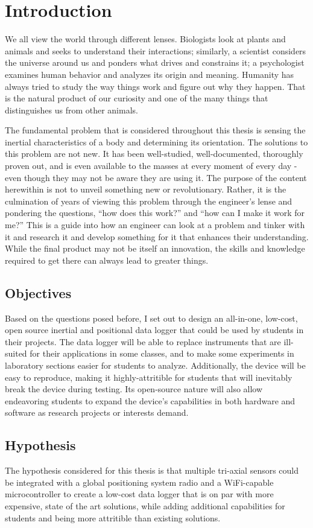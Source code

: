 \chapter{Introduction} 
We all view the world through different lenses.
Biologists look at plants and animals and seeks to understand their interactions;
similarly, a scientist considers the universe around us and ponders what drives and constrains it;
a psychologist examines human behavior and analyzes its origin and meaning.
Humanity has always tried to study the way things work and figure out why they happen.
That is the natural product of our curiosity and one of the many things that distinguishes us from other animals.

The fundamental problem that is considered throughout this thesis is sensing the inertial characteristics of a body and determining its orientation.
The solutions to this problem are not new.
It has been well-studied, well-documented, thoroughly proven out, and is even available to the masses at every moment of every day - even though they may not be aware they are using it.
The purpose of the content herewithin is not to unveil something new or revolutionary.
Rather, it is the culmination of years of viewing this problem through the engineer's lense and pondering the questions, ``how does this work?'' and ``how can I make it work for me?''
This is a guide into how an engineer can look at a problem and tinker with it and research it and develop something for it that enhances their understanding.
While the final product may not be itself an innovation, the skills and knowledge required to get there can always lead to greater things.

\section{Objectives} 
Based on the questions posed before, I set out to design an all-in-one, low-cost, open source inertial and positional data logger that could be used by students in their projects.
The data logger will be able to replace instruments that are ill-suited for their applications in some classes, and to make some experiments in laboratory sections easier for students to analyze.
Additionally, the device will be easy to reproduce, making it highly-attritible for students that will inevitably break the device during testing.
Its open-source nature will also allow endeavoring students to expand the device's capabilities in both hardware and software as research projects or interests demand.

\section{Hypothesis} 
The hypothesis considered for this thesis is that multiple tri-axial sensors could be integrated with a global positioning system radio and a WiFi-capable microcontroller to create a low-cost data logger that is on par with more expensive, state of the art solutions, while adding additional capabilities for students and being more attritible than existing solutions.